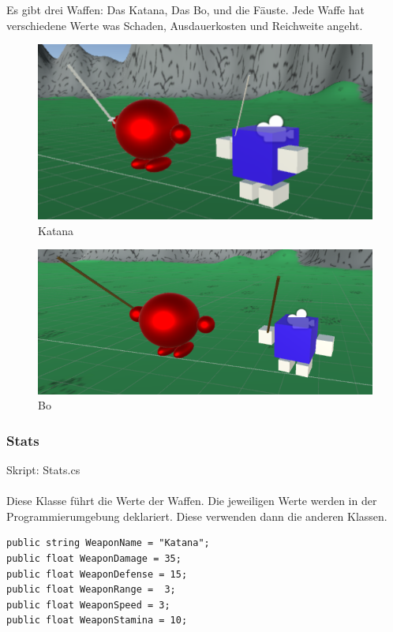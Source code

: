 Es gibt drei  Waffen: Das Katana, Das Bo, und die Fäuste.
Jede Waffe hat verschiedene Werte was Schaden, Ausdauerkosten und Reichweite angeht.
\begin{figure}[H]
\includegraphics[scale=1]{screenshots/katana.png}
\caption{Katana}
\end{figure}

\begin{figure}[H]
\includegraphics[scale=1]{screenshots/bo.png}
\caption{Bo}
\end{figure}



\subsubsection{Stats}
Skript: Stats.cs\\\\
Diese Klasse führt die Werte der Waffen. Die jeweiligen Werte werden in der Programmierumgebung deklariert. Diese verwenden dann die anderen Klassen.

\begin{lstlisting}
public string WeaponName = "Katana";
public float WeaponDamage = 35;
public float WeaponDefense = 15;
public float WeaponRange =	3;
public float WeaponSpeed = 3;
public float WeaponStamina = 10;
\end{lstlisting}

